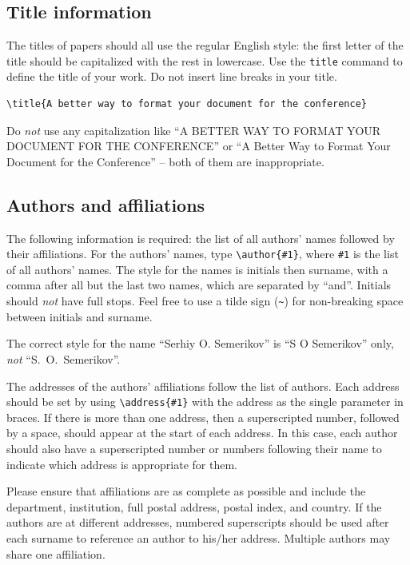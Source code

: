 \documentclass[a4paper]{jpconf}
\begin{document}
\subsection{Title information}

The titles of papers should all use the regular English style: the first letter of the title should be capitalized with the rest in lowercase. Use the \verb|title| command to define the title of your work. Do not
insert line breaks in your title.
\begin{verbatim}
\title{A better way to format your document for the conference}
\end{verbatim}

Do \textit{not} use any capitalization like ``A BETTER WAY TO FORMAT YOUR DOCUMENT FOR THE CONFERENCE'' or ``A Better Way to Format Your Document for the Conference'' -- both of them are inappropriate.


\subsection{Authors and affiliations}

The following information is required: the list of all authors' names followed by their affiliations. For the authors' names, type \verb"\author{#1}",  where \verb"#1" is the list of all authors' names. The style for the names is initials then surname, with a comma after all but the last two names, which are separated by ``and''. Initials should {\it not} have 
full stops. Feel free to use a tilde sign (\verb"~") for non-breaking space between initials and surname. 

The correct style for the name ``Serhiy O. Semerikov'' is ``S O Semerikov'' only, \textit{not} ``S.~O.~Semerikov''.

The addresses of the authors' affiliations follow the list of authors. Each address should be set by using \verb"\address{#1}" with the address as the single parameter in braces.  If there is more than one address, then a superscripted number, followed by a space, should appear at the start of each address. In this case, each author should also have a superscripted number or numbers following their name to indicate which address is appropriate for them.

Please ensure that affiliations are as complete as possible and include the department, institution, full postal address, postal index, and country. If the authors are at different addresses, numbered superscripts should be used after each surname to reference an author to his/her address.
Multiple authors may share one affiliation. 
\end{document}
